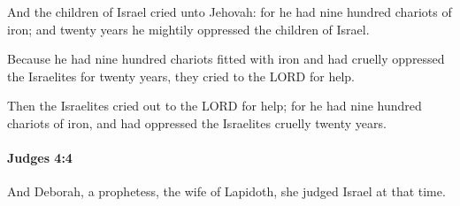 			\begin{versebox}
					\item[BHS] 
					\item[ASV] And the children of Israel cried unto Jehovah: for he had nine hundred chariots of iron; and twenty years he mightily oppressed the children of Israel.
					\item[NIV] Because he had nine hundred chariots fitted with iron and had cruelly oppressed the Israelites for twenty years, they cried to the LORD for help.
					\item[NRSV] Then the Israelites cried out to the LORD for help; for he had nine hundred chariots of iron, and had oppressed the Israelites cruelly twenty years.
			\end{versebox}

		\paragraph{Judges 4:4} %
			\label{JUDGES-4-4}

			And Deborah, a prophetess, the wife of Lapidoth, she judged Israel at that time.

